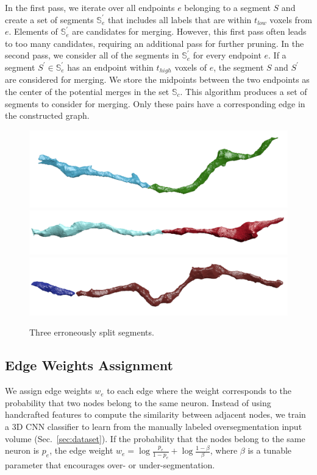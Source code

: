 In the first pass, we iterate over all endpoints $e$ belonging to a segment $S$ and create a set of segments $\mathbb{S}_e^\prime$ that includes all labels that are within $t_{low}$ voxels from $e$. Elements of $\mathbb{S}_e^\prime$ are candidates for merging. However, this first pass often leads to too many candidates, requiring an additional pass for further pruning. In the second pass, we consider all of the segments in $\mathbb{S}_e^\prime$ for every endpoint $e$. If a segment $S^\prime \in \mathbb{S}_e^\prime$ has an endpoint within $t_{high}$ voxels of $e$, the segment $S$ and $S^\prime$ are considered for merging. We store the midpoints between the two endpoints as the center of the potential merges in the set $\mathbb{S}_c$. This algorithm produces a set of segments to consider for merging. Only these pairs have a corresponding edge in the constructed graph.



\begin{figure}[t]
	\centering
	\includegraphics[width=0.32\linewidth]{./figures/split_error1.png}
	\includegraphics[width=0.32\linewidth]{./figures/split_error2.png}		\includegraphics[width=0.32\linewidth]{./figures/merge_candidate2.png}
	\caption{Three erroneously split segments.}
	\label{fig:merge_candidates}
\end{figure}

\subsection{Edge Weights Assignment}
We assign edge weights $w_e$ to each edge where the weight corresponds to the probability that two nodes belong to the same neuron.
Instead of using handcrafted features to compute the similarity between adjacent nodes, we train a 3D CNN classifier to learn from the manually labeled oversegmentation input volume (Sec.~\ref{sec:dataset}).
If the probability that the nodes belong to the same neuron is $p_e$, the edge weight $w_e = \log{\frac{p_e}{1 - p_e}} + \log{\frac{1 - \beta}{\beta}}$, where $\beta$ is a tunable parameter that encourages over- or under-segmentation.

